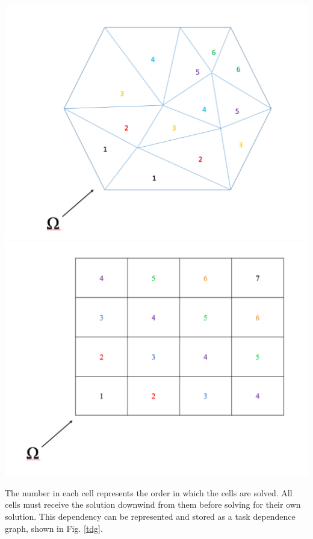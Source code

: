 \documentclass[11pt, letterpaper,titlepage,oneside]{article}
\begin{document}
\noindent\begin{minipage}{\textwidth}
\centering
\includegraphics[scale = 0.27]{../figures/UnstructureMesh.pdf}
\includegraphics[scale = 0.27]{../figures/StructuredMesh.pdf}
\label{sweeps}
\end{minipage}
\smallskip

The number in each cell represents the order in which the cells are solved. All cells must receive the solution downwind from them before solving for their own solution. This dependency can be represented and stored as a task dependence graph, shown in Fig. \ref{tdg}.
\end{document}
